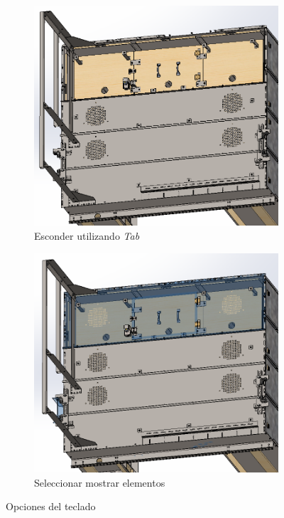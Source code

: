 \documentclass[12pt,letterpaper,final]{report}
\begin{document}
\begin{figure}[H]
	\centering
	\begin{subfigure}[b]{0.45\textwidth}
		\includegraphics[width=\textwidth]{Imagenes/solidworks_quickhide_01}
		\caption{Esconder utilizando \emph{Tab}}
		\label{fig:solidworksquickhide01}
	\end{subfigure}
	\begin{subfigure}[b]{0.45\textwidth}
		\includegraphics[width=\textwidth]{Imagenes/solidworks_quickhide_02}
		\caption{Seleccionar mostrar elementos}
		\label{fig:solidworksquickhide02}
	\end{subfigure}
	\caption{Opciones del teclado}
\end{figure}
\end{document}
